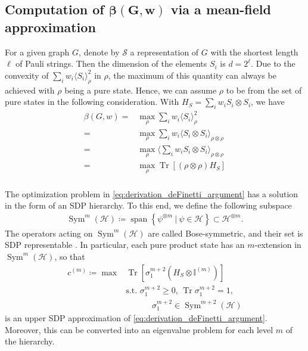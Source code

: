 \documentclass[
12pt,
prx,
aps,
reprint,
a4paper,
longbibliograph,
nofootinbib,
nobibnotes,
superscriptaddress
]{revtex4-2}
\theoremstyle{definition}
\DeclareMathOperator\tr{Tr}
\def\id{\mathbb{I}}%
\begin{document}
\subsection{\texorpdfstring{Computation of $\mathbf{\beta(G,w)}$ via a mean-field approximation}{}}

For a given graph $G$, denote by $\mathcal{S}$ a representation of $G$ with the shortest length $\ell$ of Pauli strings. Then the dimension of the elements $S_i$ is $d = 2^\ell$.
Due to the convexity of $\sum_i w_i  \langle S_i\rangle^2_{\rho}$ in $\rho$, the maximum of this quantity can always be achieved with $\rho$ being a pure state.
Hence, we can assume $\rho$ to be from the set of pure states in the following consideration.
With $H_S = \sum_i w_i S_i\otimes S_i$, we have
\begin{equation}\label{eq:derivation_deFinetti_argument}
\begin{aligned}
\beta(G,w)	= &\max_{\rho}\sum\nolimits_i w_i \langle S_i\rangle^2_{\rho} \\
	=&\max_{\rho}\sum\nolimits_i w_i \langle S_i\otimes S_i\rangle_{\rho\otimes\rho} \\
	=&\max_{\rho}\big\langle \sum\nolimits_i w_i S_i\otimes S_i\big\rangle_{\rho\otimes\rho} \\
	=&\max_{\rho} \tr[(\rho\otimes\rho) H_S]\\
\end{aligned}
\end{equation}


The optimization problem in \eqref{eq:derivation_deFinetti_argument} has a solution in the form of an SDP hierarchy. To this end, we define the following subspace
\begin{align}
  \operatorname{Sym}^m(\mathcal{H}) 
    \coloneqq \operatorname{span} \left\{ \psi^{\otimes m} \ \vert \ \psi \in \mathcal{H} \right\} \subset \mathcal{H}^{\otimes m}.
\end{align}
The operators acting on  $\operatorname{Sym}^m(\mathcal{H})$ are called Bose-symmetric, and their set is SDP representable \cite{Harrow2013_ChurchSymmetricSubspace}. In particular, each pure product state has an $m$-extension in $\operatorname{Sym}^m(\mathcal{H})$, so that 
\begin{equation}\begin{split}
\label{eq:definition_optimization_kextension}
  c^{(m)} \coloneqq \max &\tr[ \sigma_1^{m+2}  (H_S\otimes \id^{(m)}) ] \\
    &\text{s.t. }  \sigma_1^{m+2}\geq 0,\, \tr\sigma_1^{m+2}=1,\\
    &\phantom{==:}
     \sigma_1^{m+2} \in \operatorname{Sym}^{m+2}(\mathcal{H})
\end{split}\end{equation}
is an upper SDP approximation of \eqref{eq:derivation_deFinetti_argument}. Moreover, this can be converted into an eigenvalue problem for each level $m$ of the hierarchy. 
\end{document}
